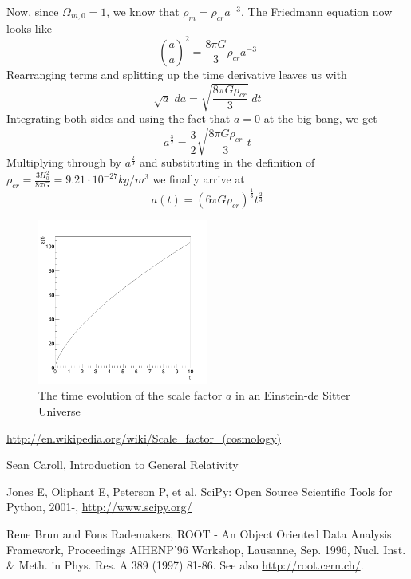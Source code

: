 \documentclass[aps,reprint,prl]{revtex4-1}
\begin{document}
Now, since $\Omega_{m,0}=1$, we know that $\rho_m=\rho_{cr}a^{-3}$.  The Friedmann equation now looks like
$$\left(\frac{\dot{a}}{a}\right)^2=\frac{8\pi G}{3}\rho_{cr}a^{-3}$$
Rearranging terms and splitting up the time derivative leaves us with
$$\sqrt{a}\;da=\sqrt{\frac{8\pi G \rho_{cr}}{3}}\;dt$$
Integrating both sides and using the fact that $a=0$ at the big bang, we get
$$a^{\frac{3}{2}}=\frac{3}{2}\sqrt{\frac{8\pi G \rho_{cr}}{3}}\;t$$
Multiplying through by $a^{\frac{2}{3}}$ and substituting in the definition of $\rho_{cr}=\frac{3H_{0}^{2}}{8\pi G}=9.21\cdot 10^{-27} kg/m^3$ we finally arrive at
$$a(t)=\left(6\pi G\rho_{cr}\right)^{\frac{1}{3}}t^{\frac{2}{3}}$$
\begin{figure}[h!]
\includegraphics[width=0.5\textwidth]{ps1_plots/a_einstein}
\caption{The time evolution of the scale factor $a$ in an Einstein-de Sitter Universe}
\end{figure}

\begin{thebibliography}{99}

\url{http://en.wikipedia.org/wiki/Scale_factor_(cosmology)}

Sean Caroll, Introduction to General Relativity

Jones E, Oliphant E, Peterson P, et al. SciPy: Open Source Scientific Tools for Python, 2001-, \url{http://www.scipy.org/} 

Rene Brun and Fons Rademakers, ROOT - An Object Oriented Data Analysis Framework, Proceedings AIHENP'96 Workshop, Lausanne, Sep. 1996, Nucl. Inst. \& Meth. in Phys. Res. A 389 (1997) 81-86. See also \url{http://root.cern.ch/}.

\end{thebibliography}
\end{document}

